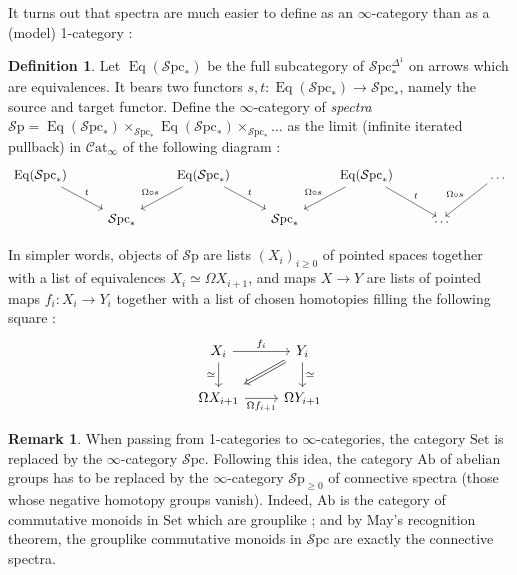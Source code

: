 \documentclass[11pt]{article}
\theoremstyle{definition}
\newtheorem{definition}[theorem]{Definition}
\newtheorem{remark}[theorem]{Remark}
\newcommand{\Catinf}{\mathcal{C}\mathrm{at}_{\infty}}
\newcommand{\Eq}{\operatorname{Eq}}
\newcommand{\Set}{\mathrm{Set}}
\newcommand{\Sp}{\mathcal{S}\mathrm{p}}
\newcommand{\Spc}{\mathcal{S}\mathrm{pc}}
\begin{document}
It turns out that spectra are much easier to define as an $\infty$-category than as a (model) 1-category :
\begin{definition}
    Let $\Eq(\Spc_*)$ be the full subcategory of $\Spc_*^{\Delta^1}$ on arrows which are equivalences.
    It bears two functors $s, t : \Eq(\Spc_*) \to \Spc_*$, namely the source and target functor.
    Define the $\infty$-category of \emph{spectra} $\Sp = \Eq(\Spc_*) \times_{\Spc_*} \Eq(\Spc_*) \times_{\Spc_*} \dots$ as the limit (infinite iterated pullback) in $\Catinf$ of the following diagram :
    \[\begin{tikzcd}
        {\Eq(\Spc_*)} && {\Eq(\Spc_*)} && {\Eq(\Spc_*)} && \dots \\
        & {\Spc_*} && {\Spc_*} && \dots
        \arrow["t", from=1-1, to=2-2]
        \arrow["{\Omega \circ s}"', from=1-3, to=2-2]
        \arrow["t", from=1-3, to=2-4]
        \arrow["{\Omega \circ s}"', from=1-5, to=2-4]
        \arrow["t", from=1-5, to=2-6]
        \arrow["{\Omega \circ s}"', from=1-7, to=2-6]
    \end{tikzcd}\]
\end{definition}
In simpler words, objects of $\Sp$ are lists $(X_i)_{i \geq 0}$ of pointed spaces together with a list of equivalences $X_i \simeq \Omega X_{i+1}$, and maps $X \to Y$ are lists of pointed maps $f_i : X_i \to Y_i$ together with a list of chosen homotopies filling the following square :
\[\begin{tikzcd}
	{X_i} & {Y_i} \\
	{\Omega X_{i+1}} & {\Omega Y_{i+1}}
	\arrow["{f_i}", from=1-1, to=1-2]
	\arrow["\simeq"', from=1-1, to=2-1]
	\arrow[shorten <=4pt, shorten >=4pt, Rightarrow, from=1-2, to=2-1]
	\arrow["\simeq", from=1-2, to=2-2]
	\arrow["{\Omega f_{i+1}}"', from=2-1, to=2-2]
\end{tikzcd}\]

\begin{remark}
    When passing from 1-categories to $\infty$-categories, the category $\Set$ is replaced by the $\infty$-category $\Spc$.
    Following this idea, the category $\mathrm{Ab}$ of abelian groups has to be replaced by the $\infty$-category $\Sp_{\geqslant 0}$ of connective spectra (those whose negative homotopy groups vanish).
    Indeed, $\mathrm{Ab}$ is the category of commutative monoids in $\Set$ which are grouplike ; and by May's recognition theorem, the grouplike commutative monoids in $\Spc$ are exactly the connective spectra.
\end{remark}
\end{document}
